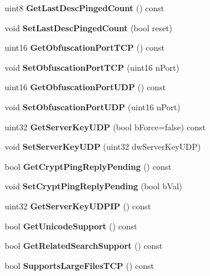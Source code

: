 \begin{DoxyCompactItemize}
\item 
uint8 {\bfseries GetLastDescPingedCount} () const \label{classCServer_aaf56809687acf07d579e6050351ff154}

\item 
void {\bfseries SetLastDescPingedCount} (bool reset)\label{classCServer_a53c0012b555df056ec2f03d5e5a80799}

\item 
uint16 {\bfseries GetObfuscationPortTCP} () const \label{classCServer_a5d2e6914bc827e621774ef71df7ceac0}

\item 
void {\bfseries SetObfuscationPortTCP} (uint16 nPort)\label{classCServer_a3b0cf65439b227bf6a3206304b88c826}

\item 
uint16 {\bfseries GetObfuscationPortUDP} () const \label{classCServer_a7e8405013df864adfdde495cd1a6dace}

\item 
void {\bfseries SetObfuscationPortUDP} (uint16 nPort)\label{classCServer_aeda97155a756a9cfcc8ffd07a3cb7e25}

\item 
uint32 {\bfseries GetServerKeyUDP} (bool bForce=false) const \label{classCServer_abb78ebd4a90968834a257adc31291694}

\item 
void {\bfseries SetServerKeyUDP} (uint32 dwServerKeyUDP)\label{classCServer_a93f8aa21b8372706acdb267c275aab14}

\item 
bool {\bfseries GetCryptPingReplyPending} () const \label{classCServer_a84755129f891054062665c807c383bfa}

\item 
void {\bfseries SetCryptPingReplyPending} (bool bVal)\label{classCServer_af09512e1510552e92b3ec7a3b5672825}

\item 
uint32 {\bfseries GetServerKeyUDPIP} () const \label{classCServer_aa3b0be7df4486fa28fec06fad6fc6dce}

\item 
bool {\bfseries GetUnicodeSupport} () const \label{classCServer_a2b3d22843299a41efc48cdb8a41407f0}

\item 
bool {\bfseries GetRelatedSearchSupport} () const \label{classCServer_af884cfba7fa7487d44b16f33bbf49dec}

\item 
bool {\bfseries SupportsLargeFilesTCP} () const \label{classCServer_aa8aeeff960807a495f82986f719229c3}


\end{DoxyCompactItemize}
